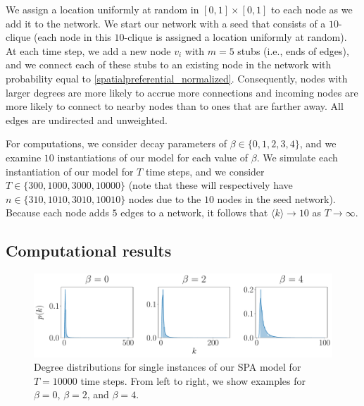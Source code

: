 \documentclass[%
 reprint,
 amsmath,amssymb,
 aps,
]{revtex4-1}
\begin{document}
We assign a location uniformly at random in $[0, 1] \times [0, 1]$ to each node as we add it to the network. 
We start our network with a seed that consists of a $10$-clique (each node in this $10$-clique is assigned a location uniformly at random). At each time step, we add a new node $v_i$ with $m=5$ stubs (i.e., ends of edges), and we connect each of these stubs to an existing node in the network with probability equal to \eqref{spatialpreferential_normalized}.
Consequently, nodes with larger degrees are more likely to accrue more connections and incoming nodes are more likely to connect to nearby nodes than to ones that are farther away. All edges are undirected and unweighted. 

For computations, we consider decay parameters of $\beta \in \{ 0, 1, 2, 3, 4\}$, and we examine $10$ instantiations of our model for each value of $\beta$.
We simulate each instantiation of our model for $T$ time steps, and we consider $T \in \{300, 1000, 3000, 10000\}$ {\color{red}(note that these will respectively have $n \in \{310, 1010, 3010, 10010\}$ nodes due to the $10$ nodes in the seed network).} Because each node adds $5$ edges to a network, it follows that $\langle k \rangle \rightarrow 10$ as $T \rightarrow \infty$.



\subsection{Computational results}




\begin{figure}
    \centering
    \includegraphics[width=1.0\linewidth]{preferential_attachment_degree_distribution.pdf}
    \caption{Degree distributions for single instances of our SPA model for $T=10000$ time steps. From left to right, we show examples for $\beta = 0$, $\beta = 2$, and $\beta = 4$.
    }
\end{figure}
\end{document}
